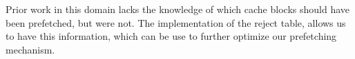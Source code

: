 {{{Prior work in this domain lacks the knowledge of which cache blocks should have 
been prefetched, but were not. The implementation of the reject table,
allows us to have this information, which can be use to further optimize
our prefetching mechanism.

%
%
%
%
%
%
}}}
